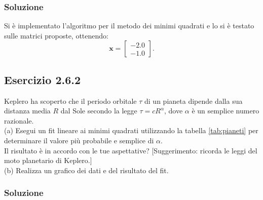 \documentclass[letterpaper, 12pt]{article}
\begin{document}
\subsubsection{Soluzione}
Si è implementato l'algoritmo per il metodo dei minimi quadrati e lo si è testato sulle matrici proposte, 
ottenendo:
\begin{equation}
    \mathbf{x} = \begin{bmatrix}
        -2.0 \\
        -1.0
    \end{bmatrix}.
\end{equation}

\subsection{Esercizio 2.6.2}
Keplero ha scoperto che il periodo orbitale $\tau$ di un pianeta dipende dalla sua distanza media $R$ dal Sole 
secondo la legge $\tau = c R^{\alpha}$, dove $\alpha$ è un semplice numero razionale. \\
(a) Esegui un fit lineare ai minimi quadrati utilizzando la tabella \ref{tab:pianeti} per determinare il valore 
più probabile e semplice di $\alpha$. \\
Il risultato è in accordo con le tue aspettative? 
[Suggerimento: ricorda le leggi del moto planetario di Keplero.] \\
(b) Realizza un grafico dei dati e del risultato del fit.

\subsubsection{Soluzione}
\end{document}
